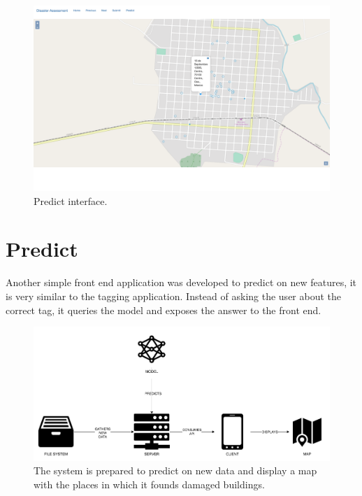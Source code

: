\begin{figure}[h]
  \centering
  \includegraphics[width=1\textwidth]{images/debris.png}
  \caption{Predict interface.}
  \label{fig:debris}
\end{figure}

\section{Predict}

Another simple front end application was developed to predict on new features, it is very similar to the tagging application. Instead of asking the user about the correct tag, it queries the model and exposes the answer to the front end.\\



\begin{figure}[h]
  \centering
  \includegraphics[width=1\textwidth]{images/predict-diagram.png}
  \caption{The system is prepared to predict on new data and display a map with the places in which it founds damaged buildings.}
  \label{fig:predict}
\end{figure}


